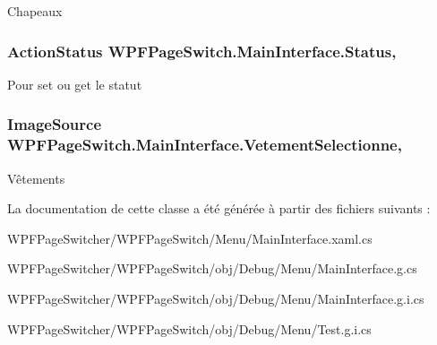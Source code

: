 Chapeaux 

\hypertarget{class_w_p_f_page_switch_1_1_main_interface_ad6597e38bbdd6ccd1fd9fdbc203aa4be}{
\subsubsection[{Status}]{\setlength{\rightskip}{0pt plus 5cm}Action\+Status W\+P\+F\+Page\+Switch.\+Main\+Interface.\+Status\hspace{0.3cm}{\ttfamily [get]}, {\ttfamily [set]}}}\label{class_w_p_f_page_switch_1_1_main_interface_ad6597e38bbdd6ccd1fd9fdbc203aa4be}


Pour set ou get le statut 

\hypertarget{class_w_p_f_page_switch_1_1_main_interface_a4d6e65debb17ae57a1b9e95a5e2a28ac}{
\subsubsection[{Vetement\+Selectionne}]{\setlength{\rightskip}{0pt plus 5cm}Image\+Source W\+P\+F\+Page\+Switch.\+Main\+Interface.\+Vetement\+Selectionne\hspace{0.3cm}{\ttfamily [get]}, {\ttfamily [set]}}}\label{class_w_p_f_page_switch_1_1_main_interface_a4d6e65debb17ae57a1b9e95a5e2a28ac}


Vêtements 



La documentation de cette classe a été générée à partir des fichiers suivants \+:\begin{DoxyCompactItemize}
\item 
W\+P\+F\+Page\+Switcher/\+W\+P\+F\+Page\+Switch/\+Menu/Main\+Interface.\+xaml.\+cs\item 
W\+P\+F\+Page\+Switcher/\+W\+P\+F\+Page\+Switch/obj/\+Debug/\+Menu/Main\+Interface.\+g.\+cs\item 
W\+P\+F\+Page\+Switcher/\+W\+P\+F\+Page\+Switch/obj/\+Debug/\+Menu/Main\+Interface.\+g.\+i.\+cs\item 
W\+P\+F\+Page\+Switcher/\+W\+P\+F\+Page\+Switch/obj/\+Debug/\+Menu/Test.\+g.\+i.\+cs\end{DoxyCompactItemize}
